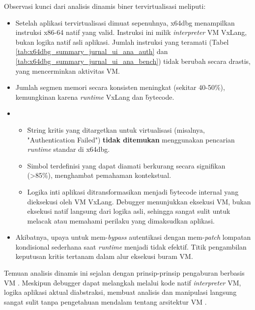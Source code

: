 Observasi kunci dari analisis dinamis biner tervirtualisasi meliputi:
\begin{itemize}
    \item {} Setelah aplikasi tervirtualisasi dimuat sepenuhnya, x64dbg menampilkan instruksi x86-64 natif yang valid. Instruksi ini milik \textit{interpreter} VM VxLang, bukan logika natif asli aplikasi. Jumlah instruksi yang teramati (Tabel \ref{tab:x64dbg_summary_jurnal_ui_ana_auth} dan \ref{tab:x64dbg_summary_jurnal_ui_ana_bench}) tidak berubah secara drastis, yang mencerminkan aktivitas VM.
    \item {} Jumlah segmen memori secara konsisten meningkat (sekitar 40-50\%), kemungkinan karena \textit{runtime} VxLang dan \f{bytecode}.
    \item {}
        \begin{itemize}
            \item {} \f{String} kritis yang ditargetkan untuk virtualisasi (misalnya, "Authentication Failed") \textbf{tidak ditemukan} menggunakan pencarian \textit{runtime} standar di x64dbg.
            \item {} Simbol terdefinisi yang dapat diamati berkurang secara signifikan (>85\%), menghambat pemahaman kontekstual.
            \item {} Logika inti aplikasi ditransformasikan menjadi \f{bytecode} internal yang dieksekusi oleh VM VxLang. \f{Debugger} menunjukkan eksekusi VM, bukan eksekusi natif langsung dari logika asli, sehingga sangat sulit untuk melacak atau memahami perilaku yang dimaksudkan aplikasi.
        \end{itemize}
    \item {} Akibatnya, upaya untuk mem-\textit{bypass} autentikasi dengan mem-\textit{patch} lompatan kondisional sederhana saat \textit{runtime} menjadi tidak efektif. Titik pengambilan keputusan kritis tertanam dalam alur eksekusi buram VM.
\end{itemize}
Temuan analisis dinamis ini sejalan dengan prinsip-prinsip pengaburan berbasis VM \cite{Sikorski2012, Ore06}. Meskipun \f{debugger} dapat melangkah melalui kode natif \textit{interpreter} VM, logika aplikasi aktual diabstraksi, membuat analisis dan manipulasi langsung sangat sulit tanpa pengetahuan mendalam tentang arsitektur VM \cite{Salwan2018SymbolicDeobfuscation}.

